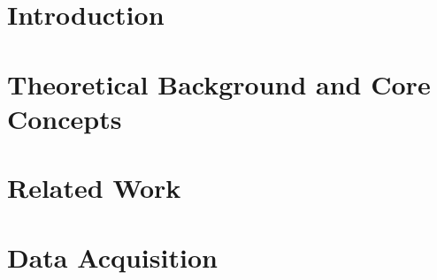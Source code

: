 \documentclass[12pt,a4paper,bibliography=totocnumbered,listof=totocnumbered]{article}
\begin{document}
\section{Introduction}






\pagebreak
\section{Theoretical Background and Core Concepts}






\pagebreak
\section{Related Work}




\pagebreak
\section{Data Acquisition}


\end{document}
